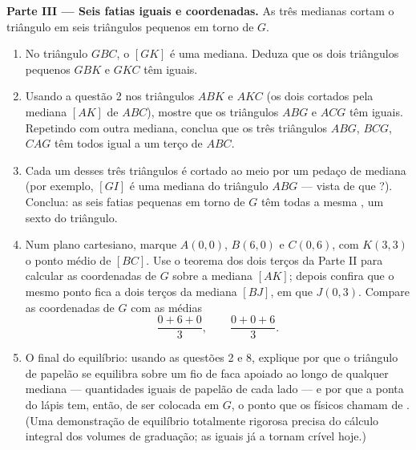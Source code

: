 \begin{problem}
\medskip
\noindent\textbf{Parte III --- Seis fatias iguais e coordenadas.}
As três medianas cortam o triângulo em seis triângulos pequenos em
torno de $G$.
\begin{enumerate}[resume]
  \item No triângulo $GBC$, o  $[GK]$ é uma mediana. Deduza que
        os dois triângulos pequenos $GBK$ e $GKC$ têm  iguais.
  \item Usando a questão 2 nos triângulos $ABK$ e $AKC$ (os dois
        cortados pela mediana $[AK]$ de $ABC$), mostre que os
        triângulos $ABG$ e $ACG$ têm  iguais. Repetindo com outra
        mediana, conclua que os três triângulos $ABG$, $BCG$, $CAG$ têm
        todos  igual a um terço de $ABC$.
  \item Cada um desses três triângulos é cortado ao meio por um pedaço
        de mediana (por exemplo, $[GI]$ é uma mediana do triângulo
        $ABG$ --- vista de que ?). Conclua: as seis fatias
        pequenas em torno de $G$ têm todas a mesma , um sexto do
        triângulo.
  \item Num plano cartesiano, marque $A(0, 0)$, $B(6, 0)$ e $C(0, 6)$,
        com $K(3, 3)$ o ponto médio de $[BC]$. Use o teorema dos dois
        terços da Parte II para calcular as coordenadas de $G$ sobre a
        mediana $[AK]$; depois confira que o mesmo ponto fica a dois
        terços da mediana $[BJ]$, em que $J(0, 3)$. Compare as
        coordenadas de $G$ com as médias
        \[
        \frac{0 + 6 + 0}{3},
        \qquad
        \frac{0 + 0 + 6}{3} .
        \]
  \item O final do equilíbrio: usando as questões 2 e 8, explique por
        que o triângulo de papelão se equilibra sobre um fio de faca
        apoiado ao longo de qualquer mediana --- quantidades iguais de
        papelão de cada lado --- e por que a ponta do lápis tem, então,
        de ser colocada em $G$, o ponto que os físicos chamam de . (Uma demonstração de equilíbrio totalmente
        rigorosa precisa do cálculo integral dos volumes de graduação;
        as  iguais já a tornam crível hoje.)
\end{enumerate}
\end{problem}
